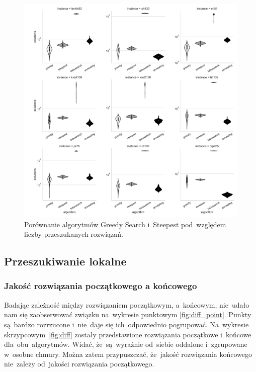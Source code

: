 \begin{figure}[H]
\begin{center}
\includegraphics[width=1.0\textwidth]{graphs/solutions_comparison_violin.pdf}
\end{center}
\caption{Porównanie algorytmów Greedy Search i~Steepest pod~względem liczby przeszukanych rozwiązań.}
\label{fig:nsol}
\end{figure}

\subsection{Przeszukiwanie lokalne}

\subsubsection{Jakość rozwiązania początkowego a końcowego}

Badając zależność między rozwiązaniem początkowym, a~końcowym, nie~udało nam się zaobserwować związku na~wykresie punktowym \ref{fig:diff_point}. Punkty są~bardzo rozrzucone i~nie~daje się ich~odpowiednio pogrupować. Na~wykresie skrzypcowym~\ref{fig:diff} zostały przedstawione rozwiązania początkowe i~końcowe dla~obu~algorytmów. Widać, że~są~wyraźnie od~siebie oddalone i~zgrupowane w~osobne chmury. Można zatem przypuszczać, że~jakość rozwiązania końcowego nie~zależy od~jakości rozwiązania początkowego.

